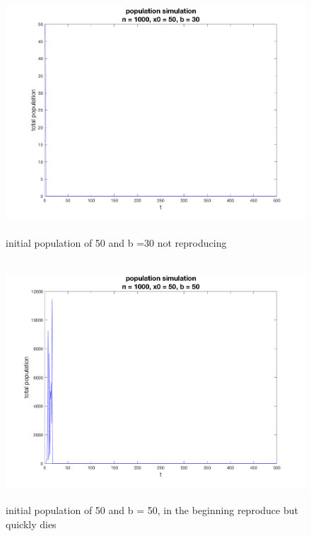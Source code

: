 \documentclass[12pt]{article}
\begin{document}
\begin{figure}[H] %
\centering
\includegraphics[width = 12 cm, height = 9cm]{single_run n1000 x050 b30.png}
\caption{initial population of 50 and b =30 not reproducing}
\label{fig:p1s2}
\end{figure}

\begin{figure}[H] %
\centering
\includegraphics[width = 12 cm, height = 9cm]{single_run n1000 x050 b50.png}
\caption{initial population of 50 and b = 50, in the beginning reproduce but quickly dies}
\label{fig:p1s3}
\end{figure}
\end{document}
